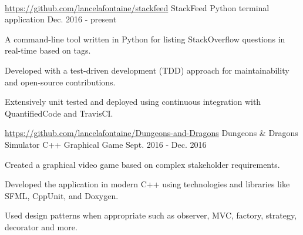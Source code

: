 \ \vspace{10mm}

\begin{cventries}
  \cventry
  {\small \href{https://github.com/lancelafontaine/stackfeed}{https://github.com/lancelafontaine/stackfeed}} %
  {\normalsize StackFeed} %
  {\small Python terminal application} %
  {\small Dec. 2016 - present} %
    {
      \begin{cvitems} %
      \item \small A command-line tool written in Python for listing StackOverflow questions in real-time based on tags.
      \item \small Developed with a test-driven development (TDD) approach for maintainability and open-source contributions.
      \item \small Extensively unit tested and deployed using continuous integration with QuantifiedCode and TravisCI.
      \end{cvitems}
    }

  \cventry
  {\small \href{https://github.com/lancelafontaine/Dungeons-and-Dragons}{https://github.com/lancelafontaine/Dungeons-and-Dragons}} %
    {\normalsize Dungeons \& Dragons Simulator} %
    {\small C++ Graphical Game} %
    {\small Sept. 2016 - Dec. 2016} %
    {
      \begin{cvitems} %
      \item \small Created a graphical video game based on complex stakeholder requirements.
      \item \small Developed the application in modern C++ using technologies and libraries like SFML, CppUnit, and Doxygen.
      \item \small Used design patterns when appropriate such as observer, MVC, factory, strategy, decorator and more.
      \end{cvitems}
    }


\end{cventries}
